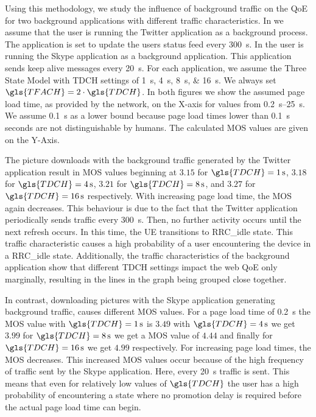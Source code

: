 Using this methodology, we study the influence of background traffic on the \gls{QoE} for two background applications with different traffic characteristics.
In  we assume that the user is running the Twitter application as a background process.
The application is set to update the users status feed every \SI{300}{\second}.
In  the user is running the Skype application as a background application.
This application sends keep alive messages every \SI{20}{\second}.
For each application, we assume the Three State Model with \gls{TDCH} settings of \SIlist{1;4;8;16}{\second}.
We always set \(\gls{TFACH} = 2\cdot \gls{TDCH}\).
In both figures we show the assumed page load time, as provided by the network, on the X-axis for values from \SIrange{0.2}{25}{\second}.
We assume \SI{0.1}{\second} as a lower bound because page load times lower than \SI{0.1}{\second} seconds are not distinguishable \cite{egger2012b} by humans.
The calculated \gls{MOS} values are given on the Y-Axis.

The picture downloads with the background traffic generated by the Twitter application result in \gls{MOS} values beginning at \(3.15\) for \(\gls{TDCH} = \SI{1}{\second}\), \(3.18\) for \(\gls{TDCH} = \SI{4}{\second}\), \(3.21\) for \(\gls{TDCH} = \SI{8}{\second}\), and \(3.27\) for \(\gls{TDCH} = \SI{16}{\second}\) respectively.
With increasing page load time, the \gls{MOS} again decreases.
This behaviour is due to the fact that the Twitter application periodically sends traffic every \SI{300}{\second}.
Then, no further activity occurs until the next refresh occurs.
In this time, the \gls{UE} transitions to \gls{RRC_idle} state.
This traffic characteristic causes a high probability of a user encountering the device in a \gls{RRC_idle} state.
Additionally, the traffic characteristics of the background application show that different \gls{TDCH} settings impact the web \gls{QoE} only marginally, resulting in the lines in the graph being grouped close together.

In contrast, downloading pictures with the Skype application generating background traffic, causes different \gls{MOS} values.
For a page load time of \SI{0.2}{\second} the \gls{MOS} value with \(\gls{TDCH} = \SI{1}{\second}\) is \(3.49\) with \(\gls{TDCH} = \SI{4}{\second}\) we get \(3.99\) for \(\gls{TDCH} = \SI{8}{\second}\) we get a \gls{MOS} value of \(4.44\) and finally for \(\gls{TDCH} = \SI{16}{\second}\) we get \(4.99\) respectively.
For increasing page load times, the \gls{MOS} decreases.
This increased \gls{MOS} values occur because of the high frequency of traffic sent by the Skype application.
Here, every \SI{20}{\second} traffic is sent.
This means that even for relatively low values of \(\gls{TDCH}\) the user has a high probability of encountering a state where no promotion delay is required before the actual page load time can begin.

